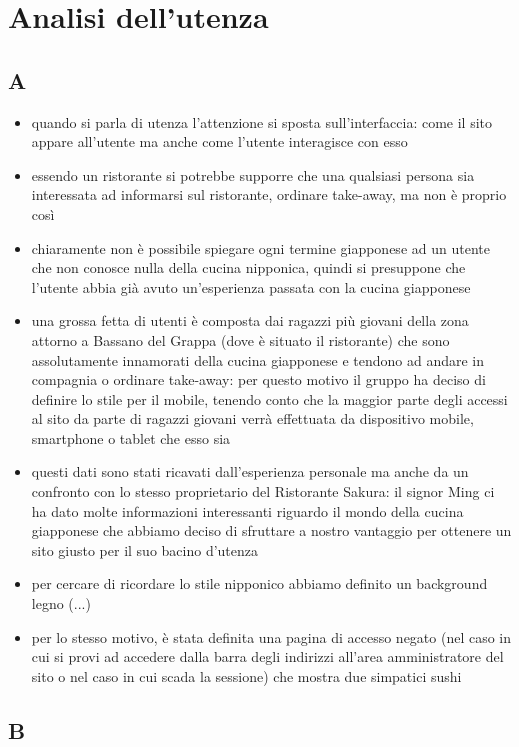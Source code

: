 \documentclass[../relazione.tex]{subfiles}
\begin{document}
\section{Analisi dell'utenza}
	\subsection{A}
	\begin{itemize}
		\item quando si parla di utenza l'attenzione si sposta sull'interfaccia: come il sito appare all'utente ma anche come l'utente interagisce con esso
		\item essendo un ristorante si potrebbe supporre che una qualsiasi persona sia interessata ad informarsi sul ristorante, ordinare take-away, ma non è proprio così
		\item chiaramente non è possibile spiegare ogni termine giapponese ad un utente che non conosce nulla della cucina nipponica, quindi si presuppone che l'utente abbia già avuto un'esperienza passata con la cucina giapponese
		\item una grossa fetta di utenti è composta dai ragazzi più giovani della zona attorno a Bassano del Grappa (dove è situato il ristorante) che sono assolutamente innamorati della cucina giapponese e tendono ad andare in compagnia o ordinare take-away: per questo motivo il gruppo ha deciso di definire lo stile per il mobile, tenendo conto che la maggior parte degli accessi al sito da parte di ragazzi giovani verrà effettuata da dispositivo mobile, smartphone o tablet che esso sia
		\item questi dati sono stati ricavati dall'esperienza personale ma anche da un confronto con lo stesso proprietario del Ristorante Sakura: il signor Ming ci ha dato molte informazioni interessanti riguardo il mondo della cucina giapponese che abbiamo deciso di sfruttare a nostro vantaggio per ottenere un sito giusto per il suo bacino d'utenza
		\item per cercare di ricordare lo stile nipponico abbiamo definito un background legno (...)
		\item per lo stesso motivo, è stata definita una pagina di accesso negato (nel caso in cui si provi ad accedere dalla barra degli indirizzi all'area amministratore del sito o nel caso in cui scada la sessione) che mostra due simpatici sushi
	\end{itemize}

	\subsection{B}
\end{document}
